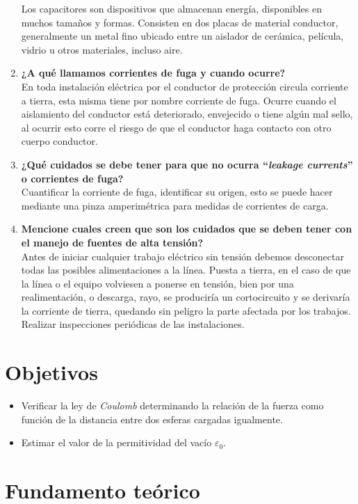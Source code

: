 \documentclass[letter,11pt]{article}
\begin{document}
\begin{enumerate}
Los capacitores son dispositivos que almacenan energía, disponibles en muchos
tamaños y formas. Consisten en dos placas de material conductor, generalmente un
metal fino ubicado entre un aislador de cerámica, película, vidrio u otros
materiales, incluso aire.
\item \textbf{¿A qué llamamos corrientes de fuga y cuando ocurre?} \\
En toda instalación eléctrica por el conductor de protección circula corriente a
tierra, esta misma tiene por nombre corriente de fuga. Ocurre cuando el
aislamiento del conductor está deteriorado, envejecido o tiene algún mal sello,
al ocurrir esto corre el riesgo de que el conductor haga contacto con otro cuerpo
conductor.
\item \textbf{¿Qué cuidados se debe tener para que no ocurra ``\emph{leakage
currents}'' o corrientes de fuga?} \\
Cuantificar la corriente de fuga, identificar su origen, esto se puede hacer
mediante una pinza amperimétrica para medidas de corrientes de carga.
\item \textbf{Mencione cuales creen que son los cuidados que se deben tener con
el manejo de fuentes de alta tensión?} \\
Antes de iniciar cualquier trabajo eléctrico sin tensión debemos desconectar
todas las posibles alimentaciones a la línea. Puesta a tierra, en el caso de que
la línea o el equipo volviesen a ponerse en tensión, bien por una
realimentación, o descarga, rayo, se produciría un cortocircuito y se derivaría
la corriente de tierra, quedando sin peligro la parte afectada por los trabajos.
Realizar inspecciones periódicas de las instalaciones.
\end{enumerate}

\section{Objetivos}
\begin{itemize}
\item Verificar la ley de \emph{Coulomb} determinando la relación de la fuerza
    como función de la distancia entre dos esferas cargadas igualmente.
\item Estimar el valor de la permitividad del vacío $\varepsilon_0$.
\end{itemize}

\section{Fundamento teórico}
\end{document}
